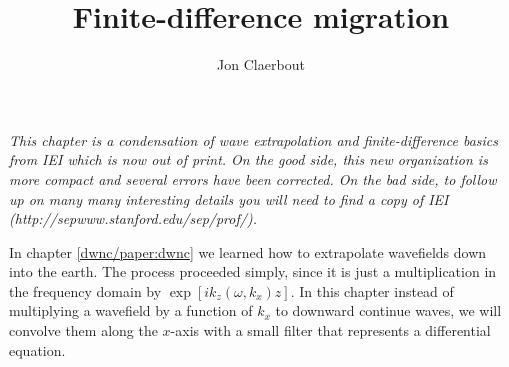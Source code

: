 \def\CAKEDIR{.}
\title{Finite-difference migration}
\author{Jon Claerbout}
\maketitle
\label{paper:fdm}
\def\cn{fdm}    %
\par
{\em 
This chapter is a condensation of
wave extrapolation and finite-difference basics from IEI
which is now out of print.
On the good side,
this new organization is more compact
and several errors have been corrected.
On the bad side,
to follow up on many
many interesting details
you will need to find a copy of IEI
(http://sepwww.stanford.edu/sep/prof/).
}
\par
In chapter \ref{dwnc/paper:dwnc} we learned how
to extrapolate wavefields down into the earth.
The process proceeded simply, since it is just a multiplication in the
frequency domain by  $\exp [ ik_z ( \omega , k_x ) z ]$.
In this chapter
instead of multiplying a wavefield by a function of $k_x$
to downward continue waves,
we will convolve them along the $x$-axis
with a small filter that represents a differential equation.
